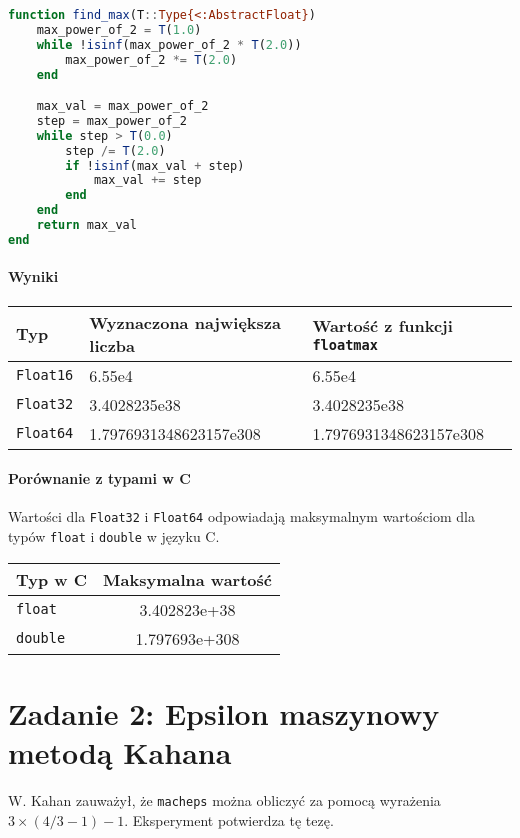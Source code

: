 \documentclass[a4paper,12pt]{article}
\begin{document}
\begin{lstlisting}[language=Julia]
function find_max(T::Type{<:AbstractFloat})
    max_power_of_2 = T(1.0)
    while !isinf(max_power_of_2 * T(2.0))
        max_power_of_2 *= T(2.0)
    end

    max_val = max_power_of_2
    step = max_power_of_2
    while step > T(0.0)
        step /= T(2.0)
        if !isinf(max_val + step)
            max_val += step
        end
    end
    return max_val
end
\end{lstlisting}

\paragraph{Wyniki}
\begin{center}
\begin{tabular}{@{}l l l@{}}
\hline
Typ & Wyznaczona największa liczba & Wartość z funkcji \texttt{floatmax} \\
\hline
\texttt{Float16} & 6.55e4 & 6.55e4 \\
\texttt{Float32} & 3.4028235e38 & 3.4028235e38 \\
\texttt{Float64} & 1.7976931348623157e308 & 1.7976931348623157e308 \\
\hline
\end{tabular}
\end{center}

\paragraph{Porównanie z typami w C}
Wartości dla \texttt{Float32} i \texttt{Float64} odpowiadają maksymalnym wartościom dla typów \texttt{float} i \texttt{double} w języku C.

\begin{center}
\begin{tabular}{@{}l c@{}}
\hline
Typ w C & Maksymalna wartość \\
\hline
\texttt{float} & 3.402823e+38 \\
\texttt{double} & 1.797693e+308 \\
\hline
\end{tabular}
\end{center}

\section{Zadanie 2: Epsilon maszynowy metodą Kahana}

W. Kahan zauważył, że \texttt{macheps} można obliczyć za pomocą wyrażenia $3 \times (4/3 - 1) - 1$. Eksperyment potwierdza tę tezę.
\end{document}
